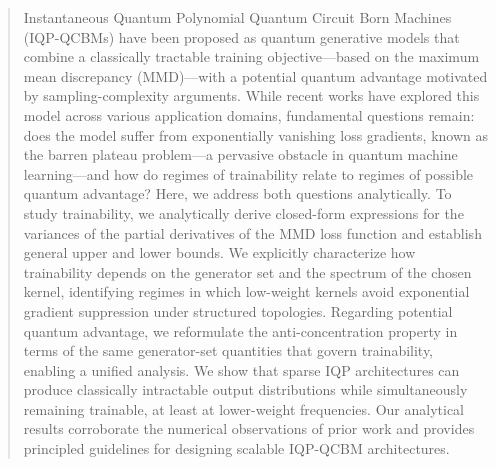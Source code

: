 \documentclass{article}
\theoremstyle{plain}
\theoremstyle{definition}
\theoremstyle{remark}
\begin{document}
\begin{abstract}
Instantaneous Quantum Polynomial Quantum Circuit Born Machines (IQP-QCBMs) have been proposed as quantum generative models that combine a classically tractable training objective—based on the maximum mean discrepancy (MMD)—with a potential quantum advantage motivated by sampling-complexity arguments. While recent works have explored this model across various application domains, fundamental questions remain: does the model suffer from exponentially vanishing loss gradients, known as the barren plateau problem—a pervasive obstacle in quantum machine learning—and how do regimes of trainability relate to regimes of possible quantum advantage? Here, we address both questions analytically. To study trainability, we analytically derive closed-form expressions for the variances of the partial derivatives of the MMD loss function and establish general upper and lower bounds. We explicitly characterize how trainability depends on the generator set and the spectrum of the chosen kernel, identifying regimes in which low-weight kernels avoid exponential gradient suppression under structured topologies. Regarding potential quantum advantage, we reformulate the anti-concentration property in terms of the same generator-set quantities that govern trainability, enabling a unified analysis. We show that sparse IQP architectures can produce classically intractable output distributions while simultaneously remaining trainable, at least at lower-weight frequencies. Our analytical results corroborate the numerical observations of prior work and provides principled guidelines for designing scalable IQP-QCBM architectures.

\end{abstract}
\end{document}
